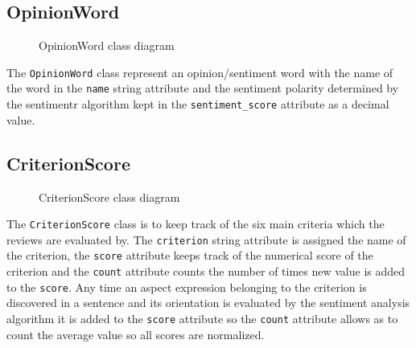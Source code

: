 \subsection{OpinionWord}
\begin{figure}[H]
\centering
{}
\caption{OpinionWord class diagram}
\label{img:opinionword}
\end{figure}

The \texttt{OpinionWord} class represent an opinion/sentiment word with the name of the word in the \texttt{name} string attribute and the sentiment polarity determined by the sentimentr algorithm kept in the \texttt{sentiment\_score} attribute as a decimal value.

\subsection{CriterionScore}
\begin{figure}[H]
\centering
{}
\caption{CriterionScore class diagram}
\label{img:criterionscore}
\end{figure}

The \texttt{CriterionScore} class is to keep track of the six main criteria which the reviews are evaluated by. The \texttt{criterion} string attribute is assigned the name of the criterion, the \texttt{score} attribute keeps track of the numerical score of the criterion and the \texttt{count} attribute counts the number of times new value is added to the \texttt{score}. Any time an aspect expression belonging to the criterion is discovered in a sentence and its orientation is evaluated by the sentiment analysis algorithm it is added to the \texttt{score} attribute so the \texttt{count} attribute allows as to count the average value so all scores are normalized.

